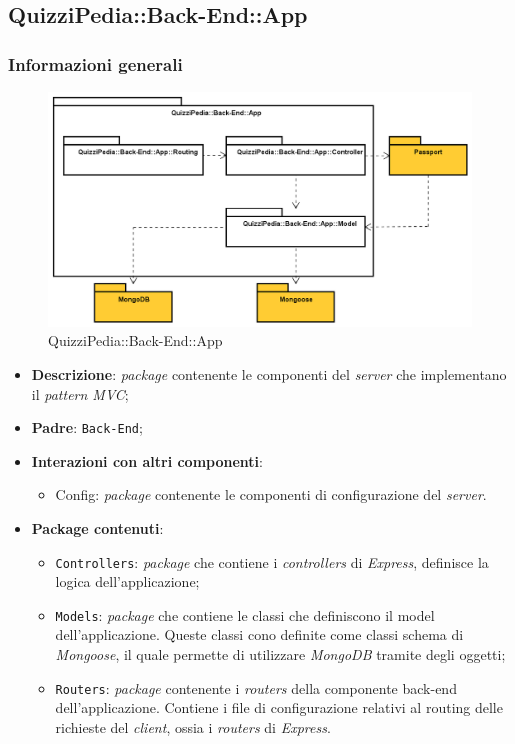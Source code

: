 \subsection{QuizziPedia::Back-End::App}
\subsubsection{Informazioni generali}
\label{QuizziPedia::Back-End::App}
\begin{figure}[ht]
	\centering
	\includegraphics[scale=0.5]{UML/Package/QuizziPedia_Back-End_App.png}
	\caption{QuizziPedia::Back-End::App}
\end{figure}
\FloatBarrier
	\begin{itemize}
		\item \textbf{Descrizione}:
		\textit{package} contenente le componenti del \textit{server} che implementano il \textit{pattern\ped{G} MVC};
		\item \textbf{Padre}: \texttt{Back-End};
		\item \textbf{Interazioni con altri componenti}:
			\begin{itemize}
				\item Config:
				\textit{package} contenente le componenti di configurazione del \textit{server}.
			\end{itemize}
		\item \textbf{Package contenuti}:
			\begin{itemize}
				\item \texttt{Controllers}:
				\textit{package} che contiene i \textit{controllers}  di \textit{Express}, definisce la logica dell'applicazione;
				\item \texttt{Models}:
				\textit{package} che contiene le classi che definiscono il model dell'applicazione. Queste classi cono definite come classi schema di \textit{Mongoose}, il quale permette di utilizzare \textit{MongoDB} tramite degli oggetti;
				\item \texttt{Routers}:
				\textit{package} contenente i \textit{routers} della componente back-end dell'applicazione. Contiene i file di configurazione relativi al routing delle richieste del \textit{client}, ossia i \textit{routers} di \textit{Express}.
			\end{itemize}
	\end{itemize}